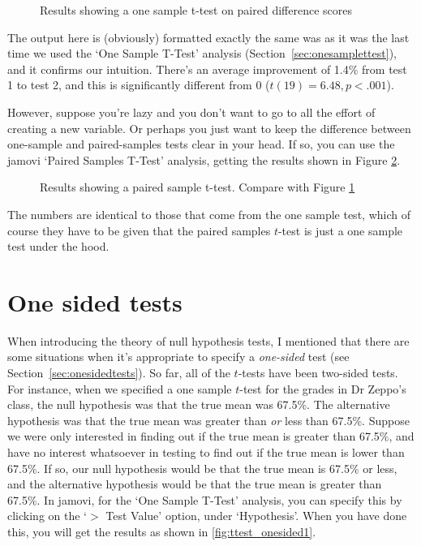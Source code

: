 \begin{figure}[h]
\begin{center}
\caption{Results showing a one sample t-test on paired difference scores}
\label{fig:ttest_paired2}
\end{center}
\end{figure}

The output here is (obviously) formatted exactly the same was as it was the last time we used the `One Sample T-Test' analysis (Section~\ref{sec:onesamplettest}), and it confirms our intuition. There's an average improvement of 1.4\% from test 1 to test 2, and this is significantly different from 0 ($t(19)=6.48, p<.001$). 

However, suppose you're lazy and you don't want to go to all the effort of creating a new variable. Or perhaps you just want to keep the difference between one-sample and paired-samples tests clear in your head. If so, you can use the jamovi `Paired Samples T-Test' analysis, getting the results shown in Figure \ref{fig:ttest_paired3}.

\begin{figure}[h]
\begin{center}
\caption{Results showing a paired sample t-test. Compare with Figure \ref{fig:ttest_paired2}}
\label{fig:ttest_paired3}
\end{center}
\end{figure}

The numbers are identical to those that come from the one sample test, which of course they have to be given that the paired samples $t$-test is just a one sample test under the hood. 


\section{One sided tests}

When introducing the theory of null hypothesis tests, I mentioned that there are some situations when it's appropriate to specify a {\it one-sided} test (see Section~\ref{sec:onesidedtests}). So far, all of the $t$-tests have been two-sided tests. For instance, when we specified a one sample $t$-test for the grades in Dr Zeppo's class, the null hypothesis was that the true mean was 67.5\%. The alternative hypothesis was that the true mean was greater than {\it or} less than 67.5\%. Suppose we were only interested in finding out if the true mean is greater than 67.5\%, and have no interest whatsoever in testing to find out if the true mean is lower than 67.5\%. If so, our null hypothesis would be that the true mean is 67.5\% or less, and the alternative hypothesis would be that the true mean is greater than 67.5\%. In jamovi, for the `One Sample T-Test' analysis, you can specify this by clicking on the `$>$ Test Value' option, under `Hypothesis'. When you have done this, you will get the results as shown in \ref{fig:ttest_onesided1}.

